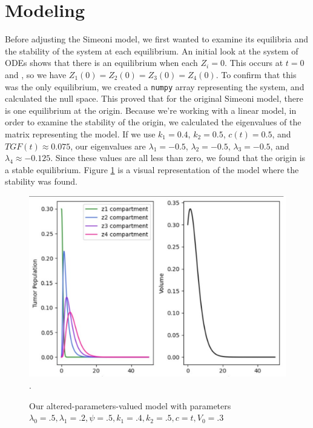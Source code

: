 \documentclass[11pt]{amsart}
\begin{document}
\section{Modeling}
Before adjusting the Simeoni model, we first wanted to examine its equilibria and the stability of the system at each equilibrium. An initial look at the system of ODEs shows that there is an equilibrium when each $Z_i = 0$. This occurs at $t=0$ and , so we have $Z_1(0) = Z_2(0) = Z_3(0) = Z_4(0)$. To confirm that this was the only equilibrium, we created a \verb!numpy! array representing the system, and calculated the null space. This proved that for the original Simeoni model, there is one equilibrium at the origin. Because we're working with a linear model, in order to examine the stability of the origin, we calculated the eigenvalues of the matrix representing the model. If we use $k_1 = 0.4$, $k_2 = 0.5$, $c(t) = 0.5$, and $TGF(t) \approx 0.075$, our eigenvalues are $\lambda_1 = -0.5$, $\lambda_2 = -0.5$, $\lambda_3 = -0.5$, and $\lambda_4 \approx -0.125$. Since these values are all less than zero, we found that the origin is a stable equilibrium. Figure \ref{fig:1} is a visual representation of the model where the stability was found.
\begin{figure}[h]

\begin{center} %
\includegraphics[width=\textwidth]{original_tumor_random_parameters.pdf}. %
\end{center}
\caption{Our altered-parameters-valued model with parameters $\lambda_0=.5, \lambda_1=.2, \psi=.5, k_1 = .4, k_2=.5, c=t, V_0 = .3$}
\label{fig:1}
\end{figure}
\end{document}
